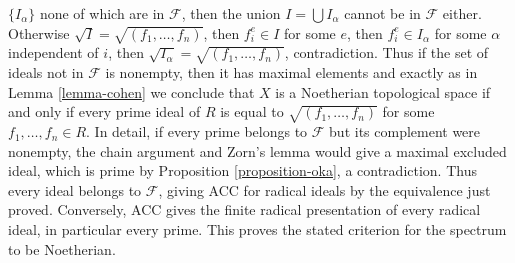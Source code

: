 \begin{example}
$\{I_\alpha\}$ none of which are in $\mathcal{F}$, then the union
$I = \bigcup I_\alpha$ cannot be in $\mathcal{F}$ either. Otherwise
$\sqrt{I} = \sqrt{(f_1, \ldots, f_n)}$, then $f_i^e \in I$ for some $e$,
then $f_i^e \in I_\alpha$ for some $\alpha$ independent of $i$, then
$\sqrt{I_\alpha} = \sqrt{(f_1, \ldots, f_n)}$, contradiction.
Thus if the set of ideals not in $\mathcal{F}$ is nonempty, then it
has maximal elements and
exactly as in Lemma \ref{lemma-cohen} we conclude that $X$ is a
Noetherian topological space if and only if every prime ideal of $R$
is equal to $\sqrt{(f_1, \ldots, f_n)}$ for some $f_1, \ldots, f_n \in R$.
In detail, if every prime belongs to $\mathcal F$ but its complement
were nonempty, the chain argument and Zorn's lemma would give a maximal
excluded ideal, which is prime by Proposition \ref{proposition-oka},
a contradiction. Thus every ideal belongs to $\mathcal F$, giving
ACC for radical ideals by the equivalence just proved.
Conversely, ACC gives the finite radical presentation of every radical
ideal, in particular every prime. This proves the stated criterion
for the spectrum to be Noetherian.
\end{example}